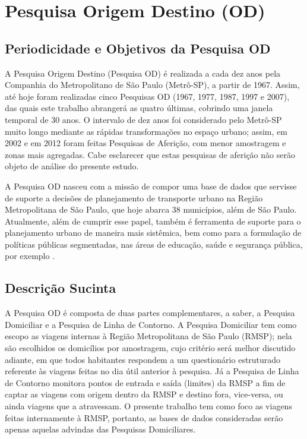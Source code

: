 \chapter{Pesquisa Origem Destino (OD)}\label{chap:pesquisa-od}

\section{Periodicidade e Objetivos da Pesquisa OD}\label{sec:period-obj}

A Pesquisa Origem Destino (Pesquisa OD) é realizada a cada dez anos pela Companhia do Metropolitano de São Paulo (Metrô-SP), a partir de 1967. Assim, até hoje foram realizadas cinco Pesquisas OD (1967, 1977, 1987, 1997 e 2007), das quais este trabalho abrangerá as quatro últimas, cobrindo uma janela temporal de 30 anos. O intervalo de dez anos foi considerado pelo Metrô-SP muito longo mediante as rápidas transformações no espaço urbano; assim, em 2002 e em 2012 foram feitas Pesquisas de Aferição, com menor amostragem e zonas mais agregadas. Cabe esclarecer que estas pesquisas de aferição não serão objeto de análise do presente estudo.

A Pesquisa OD nasceu com a missão de compor uma base de dados que servisse de suporte a decisões de planejamento de transporte urbano na Região Metropolitana de São Paulo, que hoje abarca 38 municípios, além de São Paulo. Atualmente, além de cumprir esse papel, também é ferramenta de suporte para o planejamento urbano de maneira mais sistêmica, bem como para a formulação de políticas públicas segmentadas, nas áreas de educação, saúde e segurança pública, por exemplo \cite{MANUALOD2007}.

\section{Descrição Sucinta}\label{sec:descr}

A Pesquisa OD é composta de duas partes complementares, a saber, a Pesquisa Domiciliar e a Pesquisa de Linha de Contorno. A Pesquisa Domiciliar tem como escopo as viagens internas à Região Metropolitana de São Paulo (RMSP); nela são escolhidos os domicílios por amostragem, cujo critério será melhor discutido adiante, em que todos habitantes respondem a um questionário estruturado referente às viagens feitas no dia útil anterior à pesquisa. Já a Pesquisa de Linha de Contorno monitora pontos de entrada e saída (limites) da RMSP a fim de captar as viagens com origem dentro da RMSP e destino fora, vice-versa, ou ainda viagens que a atravessam. O presente trabalho tem como foco as viagens feitas internamente à RMSP, portanto, as bases de dados consideradas serão apenas aquelas advindas das Pesquisas Domiciliares.


